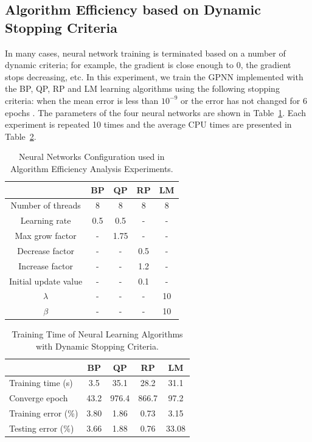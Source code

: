 \documentclass[procedia]{easychair}
\begin{document}
\subsection{Algorithm Efficiency based on Dynamic Stopping Criteria}

In many cases, neural network training is terminated based on a number of dynamic criteria; for example, the gradient is close enough to 0, the gradient stops decreasing, etc.  In this experiment, we train the GPNN implemented with the BP, QP, RP and LM learning algorithms using the following stopping criteria: when the mean error is less than $ 10 ^ {-9} $ or the error has not changed for 6 epochs \cite{matlab:neural_networks}.  The parameters of the four neural networks are shown in Table~\ref{table:config_algorithm_efficiency}.  Each experiment is repeated 10 times and the average CPU times are presented in Table~\ref{table:algorithm_efficiency}.

\begin{table}[htp]
    \centering
    \caption{Neural Networks Configuration used in Algorithm Efficiency Analysis Experiments.}
    \begin{tabular}{ c c c c c }
        \hline \hline
        & BP & QP & RP & LM \\
        \hline
        Number of threads & 8 & 8 & 8 & 8 \\
        Learning rate & 0.5 & 0.5 & - & - \\
        Max grow factor & - & 1.75 & - & - \\
        Decrease factor & - & - & 0.5 & - \\
        Increase factor & - & - & 1.2 & - \\
        Initial update value & - & - & 0.1 & - \\
        $\lambda$ & - & - & - & 10 \\
        $\beta$ & - & - & - & 10 \\
        \hline \hline
    \end{tabular}
    \label{table:config_algorithm_efficiency}
\end{table}

\begin{table}[htp]
    \centering
    \caption{Training Time of Neural Learning Algorithms with Dynamic Stopping Criteria.}
    \begin{tabular}{ l c c c c }
        \hline \hline
        & BP & QP & RP & LM \\
        \hline
        Training time (s) & 3.5 & 35.1 & 28.2 & 31.1 \\
        Converge epoch & 43.2 & 976.4 & 866.7 & 97.2 \\
        Training error (\%) & 3.80 & 1.86 & 0.73 & 3.15 \\
        Testing error (\%) & 3.66 & 1.88 & 0.76 & 33.08 \\
        \hline \hline
    \end{tabular}
    \label{table:algorithm_efficiency}
\end{table}
\end{document}
